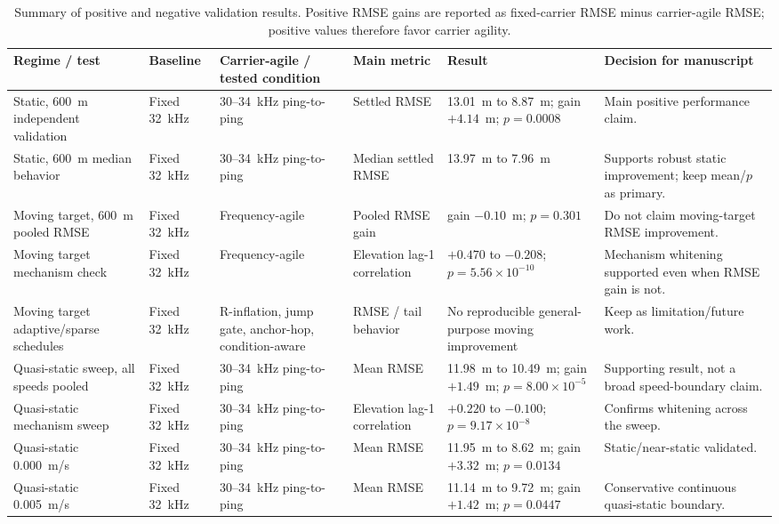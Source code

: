 \documentclass[journal]{IEEEtran}
\begin{document}
\begin{table}[!t]
\centering
\caption{Summary of positive and negative validation results. Positive RMSE gains are reported as
fixed-carrier RMSE minus carrier-agile RMSE; positive values therefore favor carrier agility.}
\label{tab:results}
\scriptsize
\setlength{\tabcolsep}{3.5pt}
\begin{tabularx}{\textwidth}{L L L L L L}
\toprule
Regime / test & Baseline & Carrier-agile / tested condition & Main metric & Result &
Decision for manuscript \\
\midrule
Static, 600~m independent validation & Fixed 32~kHz & 30--34~kHz ping-to-ping & Settled RMSE &
13.01~m to 8.87~m; gain $+4.14$~m; $p=0.0008$ & Main positive performance claim. \\
Static, 600~m median behavior & Fixed 32~kHz & 30--34~kHz ping-to-ping & Median settled RMSE &
13.97~m to 7.96~m & Supports robust static improvement; keep mean/$p$ as primary. \\
Moving target, 600~m pooled RMSE & Fixed 32~kHz & Frequency-agile & Pooled RMSE gain & gain
$-0.10$~m; $p=0.301$ & Do not claim moving-target RMSE improvement. \\
Moving target mechanism check & Fixed 32~kHz & Frequency-agile & Elevation lag-1 correlation &
$+0.470$ to $-0.208$; $p=5.56\times10^{-10}$ & Mechanism whitening supported even when RMSE gain
is not. \\
Moving target adaptive/sparse schedules & Fixed 32~kHz & R-inflation, jump gate, anchor-hop,
condition-aware & RMSE / tail behavior & No reproducible general-purpose moving improvement & Keep
as limitation/future work. \\
Quasi-static sweep, all speeds pooled & Fixed 32~kHz & 30--34~kHz ping-to-ping & Mean RMSE &
11.98~m to 10.49~m; gain $+1.49$~m; $p=8.00\times10^{-5}$ & Supporting result, not a broad
speed-boundary claim. \\
Quasi-static mechanism sweep & Fixed 32~kHz & 30--34~kHz ping-to-ping & Elevation lag-1 correlation
& $+0.220$ to $-0.100$; $p=9.17\times10^{-8}$ & Confirms whitening across the sweep. \\
Quasi-static 0.000~m/s & Fixed 32~kHz & 30--34~kHz ping-to-ping & Mean RMSE & 11.95~m to 8.62~m;
gain $+3.32$~m; $p=0.0134$ & Static/near-static validated. \\
Quasi-static 0.005~m/s & Fixed 32~kHz & 30--34~kHz ping-to-ping & Mean RMSE & 11.14~m to 9.72~m;
gain $+1.42$~m; $p=0.0447$ & Conservative continuous quasi-static boundary. \\

\end{tabularx}
\end{table}
\end{document}
